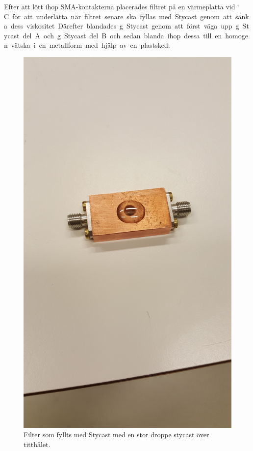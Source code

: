 \documentclass[main.tex]{subfiles}
\begin{document}
Efter att lött ihop SMA-kontakterna placerades filtret på en värmeplatta vid \unit[40]{$^\circ$C} för att underlätta när filtret senare ska fyllas med Stycast genom att sänka dess viskositet. Därefter blandades \unit[12,8]{g} Stycast genom att först väga upp \unit[10]{g} Stycast del A och \unit[2,8]{g} Stycast del B och sedan blanda ihop dessa till en homogen vätska i en metallform med hjälp av en plastsked. 

\begin{figure}
    \centering
    \includegraphics[angle=-90,trim=1250 200 1950 200,clip,width=0.975\linewidth]{figure/Filterbilder/stycast_fill.jpg}
    \caption{Filter som fyllts med Stycast med en stor droppe stycast över titthålet.}
    \label{fig:stycast_filled}
\end{figure}
\end{document}
